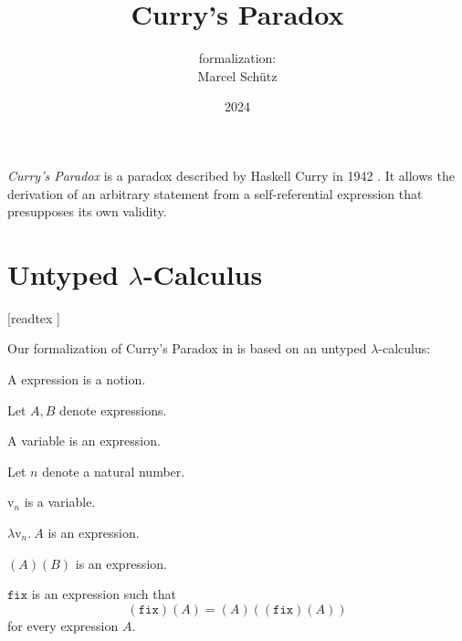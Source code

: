 \documentclass{article}
\title{Curry's Paradox}
\author{\Naproche formalization:\\[0.5em]Marcel Schütz}
\date{2024}
\newcommand{\var}[1]{\textrm{v}_{#1}}
\newcommand{\abs}[2]{\lambda\var{#1}.\ #2}
\newcommand{\app}[2]{(#1)(#2)}
\newcommand{\fix}{\texttt{fix}}
\begin{document}
  \maketitle

  \noindent \emph{Curry's Paradox} is a paradox described by Haskell Curry in 
  1942 \cite{Curry1942}.
  It allows the derivation of an arbitrary statement from a self-referential 
  expression that presupposes its own validity.

  \section*{Untyped $\lambda$-Calculus}

  \begin{imports}
    \begin{forthel}
      [readtex ]
    \end{forthel}
  \end{imports}

  \noindent Our formalization of Curry's Paradox in \Naproche is based on an 
  untyped $\lambda$-calculus:

  \begin{forthel}
    \begin{signature*}
      A expression is a notion.
    \end{signature*}
  
    Let $A, B$ denote expressions.
  
    \begin{signature*}
      A variable is an expression.
    \end{signature*}
  
    Let $n$ denote a natural number.
  
    \begin{signature*}
      $\var{n}$ is a variable.
    \end{signature*}
  
    \begin{signature*}[Abstraction]\label{abstraction}
      $\abs{n}{A}$ is an expression.
    \end{signature*}
  
    \begin{signature*}[Application]\label{application}
      $\app{A}{B}$ is an expression.
    \end{signature*}
  
    \begin{signature*}\label{fixed_point_combinator}
      $\fix$ is an expression such that
      \[\app{\fix}{A} = \app{A}{\app{\fix}{A}}\]
      for every expression $A$.
    \end{signature*}
  \end{forthel}
\end{document}
